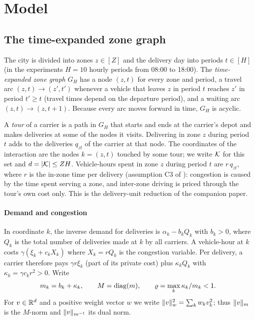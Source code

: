 \section{Model}\label{sec:model}

\subsection{The time-expanded zone graph}\label{sec:teg}
The city is divided into zones $z\in[Z]$ and the delivery day into periods $t\in[H]$ (in the experiments $H=10$ hourly periods from 08:00 to 18:00). The \emph{time-expanded zone graph} $G_H$ has a node $(z,t)$ for every zone and period, a travel arc $(z,t)\to(z',t')$ whenever a vehicle that leaves $z$ in period $t$ reaches $z'$ in period $t'\ge t$ (travel times depend on the departure period), and a waiting arc $(z,t)\to(z,t+1)$. Because every arc moves forward in time, $G_H$ is acyclic.

A \emph{tour} of a carrier is a path in $G_H$ that starts and ends at the carrier's depot and makes deliveries at some of the nodes it visits. Delivering in zone $z$ during period $t$ adds to the deliveries $q_{zt}$ of the carrier at that node. The coordinates of the interaction are the nodes $k=(z,t)$ touched by some tour; we write $\mathcal{K}$ for this set and $d=|\mathcal{K}|\le ZH$. Vehicle-hours spent in zone $z$ during period $t$ are $r\,q_{zt}$, where $r$ is the in-zone time per delivery (assumption C3 of \citealp{Omega2026}): congestion is caused by the time spent serving a zone, and inter-zone driving is priced through the tour's own cost only. This is the delivery-unit reduction of the companion paper.

\paragraph{Demand and congestion} In coordinate $k$, the inverse demand for deliveries is $\alpha_k-b_kQ_k$ with $b_k>0$, where $Q_k$ is the total number of deliveries made at $k$ by all carriers. A vehicle-hour at $k$ costs $\gamma(\xi_k+c_kX_k)$ where $X_k=rQ_k$ is the congestion variable. Per delivery, a carrier therefore pays $\gamma r\xi_k$ (part of its private cost) plus $\kappa_kQ_k$ with $\kappa_k=\gamma c_kr^2>0$. Write
\[
m_k=b_k+\kappa_k,\qquad M=\operatorname{diag}(m),\qquad \varrho=\max_{k}\kappa_k/m_k<1.
\]
For $v\in\mathbb{R}^d$ and a positive weight vector $w$ we write $\lVert v\rVert_w^2=\sum_kw_kv_k^2$; thus $\lVert v\rVert_m$ is the $M$-norm and $\lVert v\rVert_{m^{-1}}$ its dual norm.

